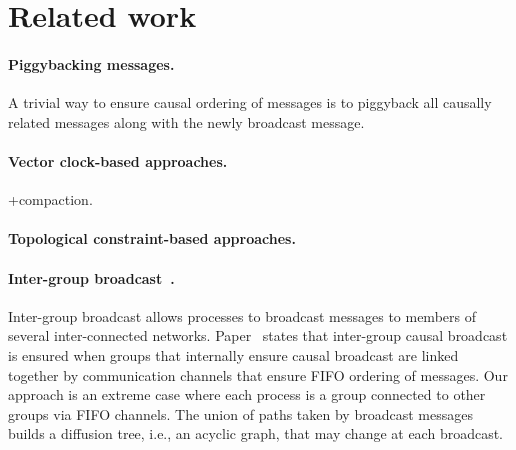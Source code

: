 
\section{Related work}
\label{sec:relatedwork}


\paragraph{Piggybacking messages.} A trivial way to ensure causal ordering of
messages is to piggyback all causally related messages along with the newly
broadcast message.


\paragraph{Vector clock-based approaches.} +compaction.
\paragraph{Topological constraint-based approaches.}

\paragraph{Inter-group
  broadcast~\cite{johnson1998scalable,johnson1999intergroup}.} Inter-group
broadcast allows processes to broadcast messages to members of several
inter-connected networks. Paper~\cite{johnson1999intergroup} states that
inter-group causal broadcast is ensured when groups that internally ensure
causal broadcast are linked together by communication channels that ensure FIFO
ordering of messages. Our approach is an extreme case where each process is a
group connected to other groups via FIFO channels. The union of paths taken by
broadcast messages builds a diffusion tree, i.e., an acyclic graph, that may
change at each broadcast.

